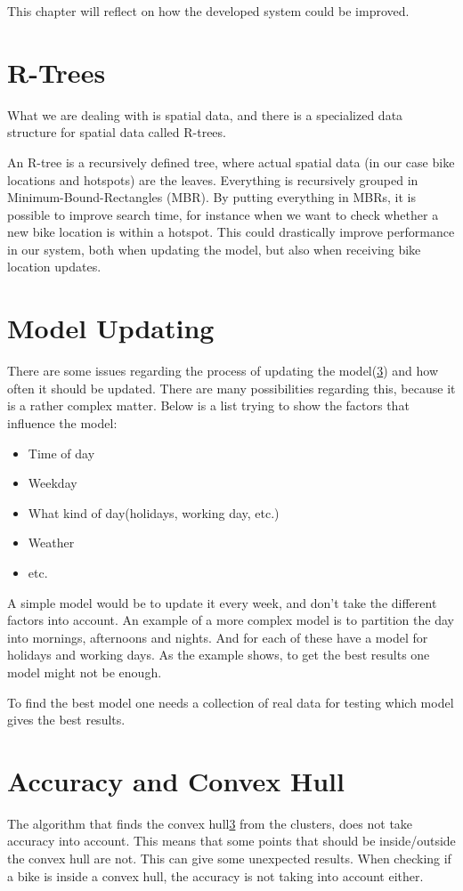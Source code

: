 This chapter will reflect on how the developed system could be improved.

\section{R-Trees}
What we are dealing with is spatial data, and there is a specialized data structure for spatial data called R-trees.\cite[Section 25.3.5.3]{database_system_concepts}

An R-tree is a recursively defined tree, where actual spatial data (in our case bike locations and hotspots) are the leaves.
Everything is recursively grouped in Minimum-Bound-Rectangles (MBR).
By putting everything in MBRs, it is possible to improve search time, for instance when we want to check whether a new bike location is within a hotspot.
This could drastically improve performance in our system, both when updating the model, but also when receiving bike location updates.

\section{Model Updating}\label{reflection:model_updating}
There are some issues regarding the process of updating the model(\cref{}) and how often it should be updated.
There are many possibilities regarding this, because it is a rather complex matter.
Below is a list trying to show the factors that influence the model:
\begin{itemize}
\item Time of day
\item Weekday
\item What kind of day(holidays, working day, etc.)
\item Weather
\item etc.
\end{itemize}
A simple model would be to update it every week, and don't take the different factors into account.
An example of a more complex model is to partition the day into mornings, afternoons and nights.
And for each of these have a model for holidays and working days.
As the example shows, to get the best results one model might not be enough. 

To find the best model one needs a collection of real data for testing which model gives the best results.


\section{Accuracy and Convex Hull}
The algorithm that finds the convex hull\cref{} from the clusters, does not take accuracy into account.
This means that some points that should be inside/outside the convex hull are not.
This can give some unexpected results.
When checking if a bike is inside a convex hull, the accuracy is not taking into account either.


